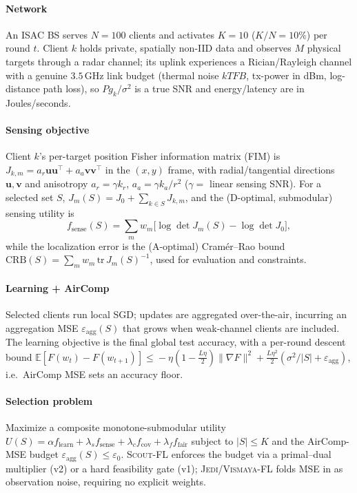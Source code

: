 \documentclass[journal,onecolumn,11pt]{IEEEtran}
\newcommand{\jedi}{\textsc{Jedi/Vismaya-FL}}
\newcommand{\scout}{\textsc{Scout-FL}}
\begin{document}
\paragraph{Network} An ISAC BS serves $N{=}100$ clients and activates $K{=}10$
($K/N{=}10\%$) per round $t$. Client $k$ holds private, spatially non-IID data and
observes $M$ physical targets through a radar channel; its uplink experiences a
Rician/Rayleigh channel with a genuine $3.5$\,GHz link budget (thermal noise $kTFB$,
tx-power in dBm, log-distance path loss), so $P g_k/\sigma^2$ is a true SNR and energy/latency
are in Joules/seconds.

\paragraph{Sensing objective} Client $k$'s per-target position Fisher information matrix
(FIM) is $J_{k,m}=a_r\mathbf{u}\mathbf{u}^{\!\top}+a_a\mathbf{v}\mathbf{v}^{\!\top}$ in the
$(x,y)$ frame, with radial/tangential directions $\mathbf{u},\mathbf{v}$ and anisotropy
$a_r=\gamma k_r$, $a_a=\gamma k_a/r^2$ ($\gamma=$ linear sensing SNR). For a selected set
$S$, $J_m(S)=J_0+\sum_{k\in S}J_{k,m}$, and the (D-optimal, submodular) sensing utility is
\begin{equation}
f_{\mathrm{sense}}(S)=\sum_{m} w_m\big[\log\det J_m(S)-\log\det J_0\big],
\end{equation}
while the localization error is the (A-optimal) Cram\'er--Rao bound
$\mathrm{CRB}(S)=\sum_m w_m\,\mathrm{tr}\,J_m(S)^{-1}$, used for evaluation and constraints.

\paragraph{Learning + AirComp} Selected clients run local SGD; updates are aggregated
over-the-air, incurring an aggregation MSE $\varepsilon_{\mathrm{agg}}(S)$ that grows when
weak-channel clients are included. The learning objective is the final global test
accuracy, with a per-round descent bound
$\mathbb{E}[F(w_{t})-F(w_{t+1})]\!\le\!-\eta(1-\tfrac{L\eta}{2})\|\nabla F\|^2
+\tfrac{L\eta^2}{2}(\sigma^2/|S|+\varepsilon_{\mathrm{agg}})$, i.e.\ AirComp MSE sets an
accuracy floor.

\paragraph{Selection problem} Maximize a composite monotone-submodular utility
$U(S)=\alpha f_{\mathrm{learn}}+\lambda_s f_{\mathrm{sense}}+\lambda_c f_{\mathrm{cov}}
+\lambda_f f_{\mathrm{fair}}$ subject to $|S|\le K$ and the AirComp-MSE budget
$\varepsilon_{\mathrm{agg}}(S)\le\varepsilon_0$. \scout{} enforces the budget via a
primal--dual multiplier (v2) or a hard feasibility gate (v1); \jedi{} folds MSE in as
observation noise, requiring no explicit weights.
\end{document}
